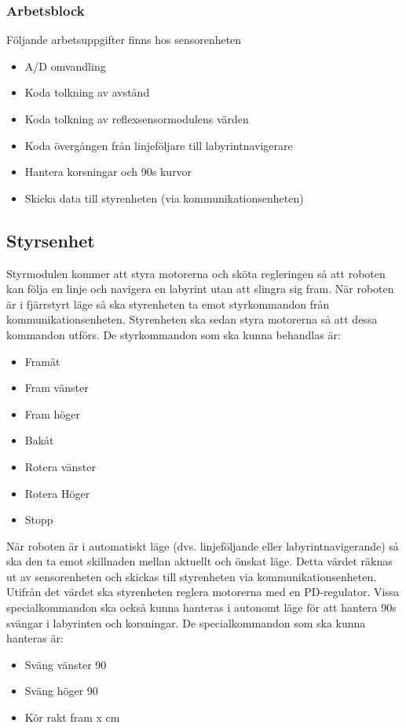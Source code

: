 \documentclass[a4paper,12pt]{article}
\begin{document}
\subsubsection{Arbetsblock}
Följande arbetsuppgifter finns hos sensorenheten
\begin{itemize}
        \item A/D omvandling
        \item Koda tolkning av avstånd
        \item Koda tolkning av reflexsensormodulens värden
        \item Koda övergången från linjeföljare till labyrintnavigerare
        \item Hantera korsningar och 90\degree s kurvor
        \item Skicka data till styrenheten (via kommunikationsenheten)
\end{itemize}

\subsection{Styrsenhet}
Styrmodulen kommer att styra motorerna och sköta regleringen så att roboten kan följa en linje och navigera en labyrint utan att slingra sig fram.
När roboten är i fjärrstyrt läge så ska styrenheten ta emot styrkommandon från kommunikationsenheten.
Styrenheten ska sedan styra motorerna så att dessa kommandon utförs. De styrkommandon som ska kunna behandlas är:
\begin{itemize}
        \item Framåt
        \item Fram vänster
        \item Fram höger
        \item Bakåt
        \item Rotera vänster
        \item Rotera Höger
        \item Stopp
\end{itemize}

När roboten är i automatiskt läge (dvs. linjeföljande eller labyrintnavigerande) så ska den ta emot skillnaden mellan aktuellt och önskat läge.
Detta värdet räknas ut av sensorenheten och skickas till styrenheten via kommunikationsenheten.
Utifrån det värdet ska styrenheten reglera motorerna med en PD-regulator. Vissa specialkommandon ska också kunna hanteras i autonomt läge 
för att hantera 90\degree s svängar i labyrinten och korsningar. De specialkommandon som ska kunna hanteras är:
\begin{itemize}
        \item Sväng vänster 90\degree
        \item Sväng höger 90\degree
        \item Kör rakt fram x cm
\end{itemize}
\end{document}
